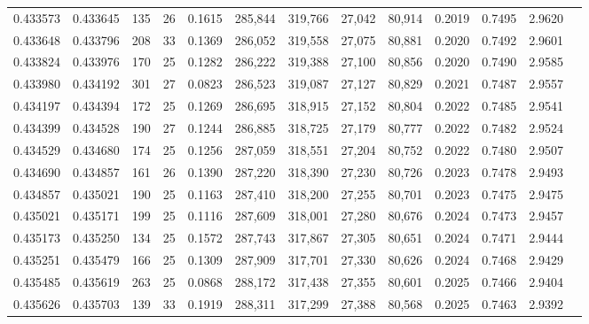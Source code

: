 \begin{tabular}{rrrrrrrrrrrrr}
0.433573 & 0.433645 &   135 &  26 &                                     0.1615 & 285,844 & 319,766 &  27,042 &  80,914 & 0.2019 & 0.7495 & 2.9620 \\
0.433648 & 0.433796 &   208 &  33 &                                     0.1369 & 286,052 & 319,558 &  27,075 &  80,881 & 0.2020 & 0.7492 & 2.9601 \\
0.433824 & 0.433976 &   170 &  25 &                                     0.1282 & 286,222 & 319,388 &  27,100 &  80,856 & 0.2020 & 0.7490 & 2.9585 \\
0.433980 & 0.434192 &   301 &  27 &                                     0.0823 & 286,523 & 319,087 &  27,127 &  80,829 & 0.2021 & 0.7487 & 2.9557 \\
0.434197 & 0.434394 &   172 &  25 &                                     0.1269 & 286,695 & 318,915 &  27,152 &  80,804 & 0.2022 & 0.7485 & 2.9541 \\
0.434399 & 0.434528 &   190 &  27 &                                     0.1244 & 286,885 & 318,725 &  27,179 &  80,777 & 0.2022 & 0.7482 & 2.9524 \\
0.434529 & 0.434680 &   174 &  25 &                                     0.1256 & 287,059 & 318,551 &  27,204 &  80,752 & 0.2022 & 0.7480 & 2.9507 \\
0.434690 & 0.434857 &   161 &  26 &                                     0.1390 & 287,220 & 318,390 &  27,230 &  80,726 & 0.2023 & 0.7478 & 2.9493 \\
0.434857 & 0.435021 &   190 &  25 &                                     0.1163 & 287,410 & 318,200 &  27,255 &  80,701 & 0.2023 & 0.7475 & 2.9475 \\
0.435021 & 0.435171 &   199 &  25 &                                     0.1116 & 287,609 & 318,001 &  27,280 &  80,676 & 0.2024 & 0.7473 & 2.9457 \\
0.435173 & 0.435250 &   134 &  25 &                                     0.1572 & 287,743 & 317,867 &  27,305 &  80,651 & 0.2024 & 0.7471 & 2.9444 \\
0.435251 & 0.435479 &   166 &  25 &                                     0.1309 & 287,909 & 317,701 &  27,330 &  80,626 & 0.2024 & 0.7468 & 2.9429 \\
0.435485 & 0.435619 &   263 &  25 &                                     0.0868 & 288,172 & 317,438 &  27,355 &  80,601 & 0.2025 & 0.7466 & 2.9404 \\
0.435626 & 0.435703 &   139 &  33 &                                     0.1919 & 288,311 & 317,299 &  27,388 &  80,568 & 0.2025 & 0.7463 & 2.9392 \\

\end{tabular}
